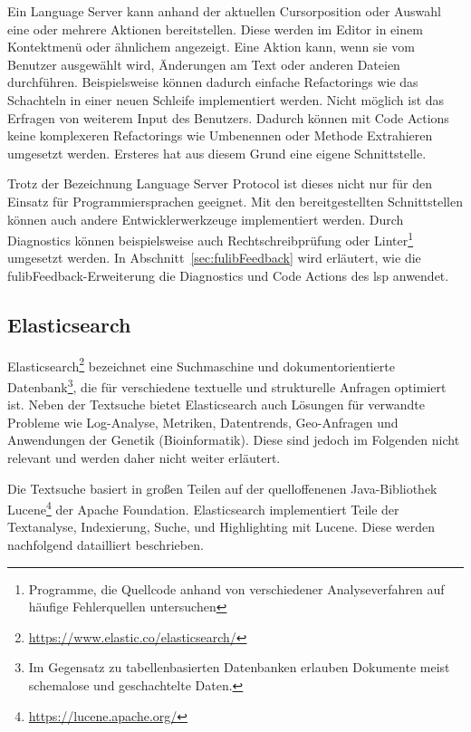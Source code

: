 \begin{itemize}
    Ein Language Server kann anhand der aktuellen Cursorposition oder Auswahl eine oder mehrere Aktionen bereitstellen.
    Diese werden im Editor in einem Kontektmenü oder ähnlichem angezeigt.
    Eine Aktion kann, wenn sie vom Benutzer ausgewählt wird, Änderungen am Text oder anderen Dateien durchführen.
    Beispielsweise können dadurch einfache Refactorings wie das Schachteln in einer neuen Schleife implementiert werden.
    Nicht möglich ist das Erfragen von weiterem Input des Benutzers.
    Dadurch können mit Code Actions keine komplexeren Refactorings wie Umbenennen oder Methode Extrahieren umgesetzt werden.
    Ersteres hat aus diesem Grund eine eigene Schnittstelle.
\end{itemize}

Trotz der Bezeichnung Language Server Protocol ist dieses nicht nur für den Einsatz für Programmiersprachen geeignet.
Mit den bereitgestellten Schnittstellen können auch andere Entwicklerwerkzeuge implementiert werden.
Durch Diagnostics können beispielsweise auch Rechtschreibprüfung oder Linter\footnote{Programme, die Quellcode anhand von verschiedener Analyseverfahren auf häufige Fehlerquellen untersuchen} umgesetzt werden.
In Abschnitt~\ref{sec:fulibFeedback} wird erläutert, wie die fulibFeedback-Erweiterung die Diagnostics und Code Actions des \ac{lsp} anwendet.

\subsection{Elasticsearch}\label{subsec:elasticsearch}

Elasticsearch\footnote{\url{https://www.elastic.co/elasticsearch/}} bezeichnet eine Suchmaschine und dokumentorientierte Datenbank\footnote{Im Gegensatz zu tabellenbasierten Datenbanken erlauben Dokumente meist schemalose und geschachtelte Daten.}, die für verschiedene textuelle und strukturelle Anfragen optimiert ist.
Neben der Textsuche bietet Elasticsearch auch Lösungen für verwandte Probleme wie Log-Analyse, Metriken, Datentrends, Geo-Anfragen und Anwendungen der Genetik (Bioinformatik).
Diese sind jedoch im Folgenden nicht relevant und werden daher nicht weiter erläutert.

Die Textsuche basiert in großen Teilen auf der quelloffenenen Java-Bibliothek Lucene\footnote{\url{https://lucene.apache.org/}} der Apache Foundation.\cite{elastic-and-lucene}
Elasticsearch implementiert Teile der Textanalyse, Indexierung, Suche, und Highlighting mit Lucene.
Diese werden nachfolgend datailliert beschrieben.

